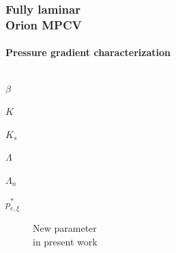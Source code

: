 \documentclass[mathserif]{beamer}
\begin{document}
\begin{frame}
    \frametitle{Fully laminar\\Orion MPCV}
    \framesubtitle{Pressure gradient characterization}
    \vspace{-4.5em}
    \begin{columns}[c]
        \begin{column}{0.40\linewidth}
            \vspace{2em}
            \begin{description}
                \item[$\beta$]            \citet{Clauser1954Turbulent}
                \item[$K$]                \citet{Launder1964Laminarization}
                \item[$K_s$]              \citet{Pohlhausen1921Zur}
                \item[$\Lambda$]          \citet{Cal2008Similarity}
                \item[$\Lambda_n$]        \citet{Narasimha1979Relaminarization}
                \item[$p_{e,\xi}^{\ast}$] New parameter\\
                                          in present work
            \end{description}
        \end{column}
        \begin{column}{0.5\linewidth}

\end{column}
\end{columns}
\end{frame}
\end{document}
